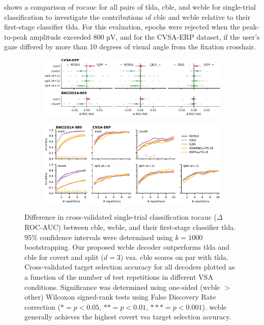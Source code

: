  shows a comparison of \ac{rocauc}
for all pairs of \ac{tlda}, \ac{cble},
and \ac{wcble} for single-trial classification to investigate the contributions of
\ac{cble} and \ac{wcble} relative to their first-stage classifier \ac{tlda}.
For this evaluation, epochs were rejected when the peak-to-peak amplitude
exceeded 800 µV, and for the CVSA-ERP dataset, if the user's gaze differed by more than
10 degrees of visual angle from the fixation crosshair.
\begin{figure}
  \bigskip
	\begin{subfigure}{\linewidth}
		\caption{}
		\label{fig:covert-align/single-trial-roc-auc-diff}%
		\includegraphics[width=\linewidth]{figures/covert_align/figure4a.pdf}
	\end{subfigure}

	\bigskip

	\begin{subfigure}{\linewidth}
		\caption{}
		\label{fig:covert-align/block-eval}%
		\includegraphics[width=\linewidth]{figures/covert_align/figure4b.pdf}
	\end{subfigure}
  \caption[Decoder performance.]{%
		 Difference in cross-validated
    single-trial classification \acl{rocauc} ($\Delta$ROC-AUC)
    between \ac{cble}, \ac{wcble}, and their first-stage classifier \ac{tlda}.
    95\% confidence intervals were determined using $k=1000$ bootstrapping.
    Our proposed \ac{wcble} decoder outperforms \ac{tlda} and \ac{cble} for covert and split
    ($d=3$)	\ac{vsa}. \ac{cble} scores on par with \ac{tlda}.
		 Cross-validated target selection accuracy for
    all decoders plotted as a function of the number of test repetitions in
    different VSA conditions. Significance was determined using one-sided
    (\ac{wcble} $>$ other) Wilcoxon signed-rank tests using False Discovery Rate correction
    ($*= p<0.05$, $**=p<0.01$, $***=p<0.001$). \ac{wcble} generally achieves the highest
    covert \ac{vsa} target selection accuracy.}
\end{figure}

